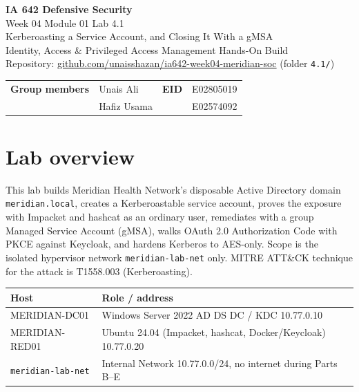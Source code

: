 \documentclass[11pt,letterpaper]{article}
\begin{document}
\begin{center}
{\LARGE\bfseries IA 642 Defensive Security}\\[0.25em]
{\Large Week 04 Module 01 Lab 4.1}\\[0.2em]
{\large Kerberoasting a Service Account, and Closing It With a gMSA}\\[0.35em]
{\small Identity, Access \& Privileged Access Management Hands-On Build}\\[0.25em]
{\small Repository:
\href{https://github.com/unaisshazan/ia642-week04-meridian-soc}{github.com/unaisshazan/ia642-week04-meridian-soc}
(folder \texttt{4.1/})}\\[0.35em]
\end{center}

\begin{tabularx}{\textwidth}{@{}l X l l@{}}
\toprule
\textbf{Group members} & Unais Ali & \textbf{EID} & E02805019 \\
 & Hafiz Usama &  & E02574092 \\
\bottomrule
\end{tabularx}

\vspace{0.6em}

\section*{Lab overview}

This lab builds Meridian Health Network's disposable Active Directory domain \texttt{meridian.local}, creates a Kerberoastable service account, proves the exposure with Impacket and hashcat as an ordinary user, remediates with a group Managed Service Account (gMSA), walks OAuth 2.0 Authorization Code with PKCE against Keycloak, and hardens Kerberos to AES-only. Scope is the isolated hypervisor network \texttt{meridian-lab-net} only. MITRE ATT\&CK technique for the attack is T1558.003 (Kerberoasting).

\begin{tabularx}{\textwidth}{@{}l Y@{}}
\toprule
\textbf{Host} & \textbf{Role / address} \\
\midrule
MERIDIAN-DC01 & Windows Server 2022 AD DS DC / KDC \textperiodcentered{} 10.77.0.10 \\
MERIDIAN-RED01 & Ubuntu 24.04 (Impacket, hashcat, Docker/Keycloak) \textperiodcentered{} 10.77.0.20 \\
\texttt{meridian-lab-net} & Internal Network 10.77.0.0/24, no internet during Parts B--E \\
\bottomrule
\end{tabularx}
\end{document}
